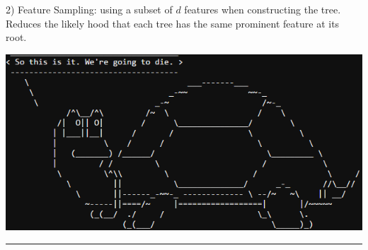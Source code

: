 \documentclass[landscape]{article}
\begin{document}
\begin{multicols}{3}
2) Feature Sampling: using a subset of $d$ features when constructing the tree. Reduces the likely hood that each tree has the same prominent feature at its root.



\begin{center}\includegraphics[scale=0.5]{inspiration}\end{center}

\rule{0.3\linewidth}{0.25pt}
\newpage
\scriptsize


\end{multicols}
\end{document}
